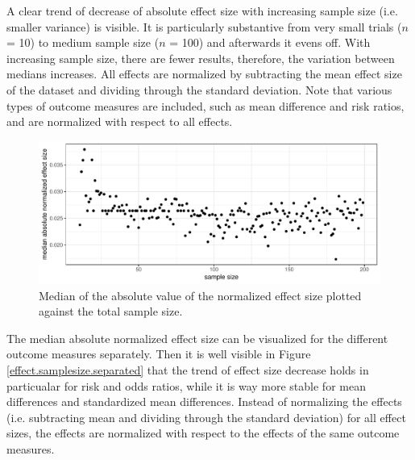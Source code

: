 \documentclass[11pt,a4paper,twoside]{book}\usepackage[]{graphicx}\usepackage[]{color}
\newenvironment{knitrout}{}{} %
\begin{document}
\vspace{0mm}
A clear trend of decrease of absolute effect size with increasing sample size (i.e. smaller variance) is visible. It is particularly substantive from very small trials ($n$ = 10) to medium sample size ($n$ = 100) and afterwards it evens off. With increasing sample size, there are fewer results, therefore, the variation between medians increases. All effects are normalized by subtracting the mean effect size of the dataset and dividing through the standard deviation. Note that various types of outcome measures are included, such as mean difference and risk ratios, and are normalized with respect to all effects.

\begin{figure}
\begin{knitrout}
\color{fgcolor}

{\centering \includegraphics[width=\textwidth-3cm]{figure/ch02_figunnamed-chunk-17-1} 

}



\end{knitrout}
\caption{Median of the absolute value of the normalized effect size plotted against the total sample size.}
\label{effect.samplesize}
\end{figure}

The median absolute normalized effect size can be visualized for the different outcome measures separately. Then it is well visible in Figure \ref{effect.samplesize.separated} that the trend of effect size decrease holds in particualar for risk and odds ratios, while it is way more stable for mean differences and standardized mean differences. Instead of normalizing the effects (i.e. subtracting mean and dividing through the standard deviation) for all effect sizes, the effects are normalized with respect to the effects of the same outcome measures. 
\end{document}
